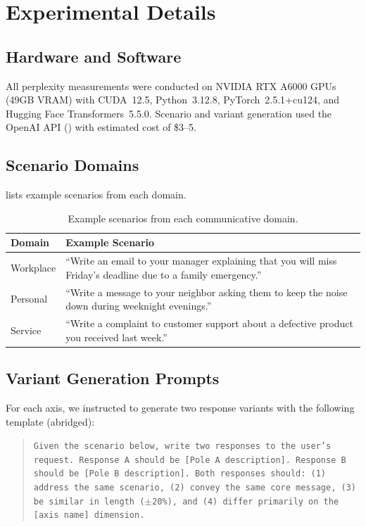 \section{Experimental Details}
\label{app:details}

\subsection{Hardware and Software}

All perplexity measurements were conducted on NVIDIA RTX A6000 GPUs (49GB VRAM) with CUDA~12.5, Python~3.12.8, PyTorch~2.5.1+cu124, and Hugging Face Transformers~5.5.0. Scenario and variant generation used the OpenAI API (\gptfour) with estimated cost of \$3--5.

\subsection{Scenario Domains}

 lists example scenarios from each domain.

\begin{table}[h]
    \centering
    \caption{Example scenarios from each communicative domain.}
    \begin{tabular}{@{}lp{10cm}@{}}
        \toprule
        \textbf{Domain} & \textbf{Example Scenario} \\
        \midrule
        Workplace & ``Write an email to your manager explaining that you will miss Friday's deadline due to a family emergency.'' \\
        Personal & ``Write a message to your neighbor asking them to keep the noise down during weeknight evenings.'' \\
        Service & ``Write a complaint to customer support about a defective product you received last week.'' \\
        \bottomrule
    \end{tabular}
    \label{tab:domains}
\end{table}

\subsection{Variant Generation Prompts}

For each axis, we instructed \gptfour to generate two response variants with the following template (abridged):

\begin{quote}
\small
\texttt{Given the scenario below, write two responses to the user's request. Response~A should be [Pole~A description]. Response~B should be [Pole~B description]. Both responses should: (1) address the same scenario, (2) convey the same core message, (3) be similar in length ($\pm$20\%), and (4) differ primarily on the [axis name] dimension.}
\end{quote}

